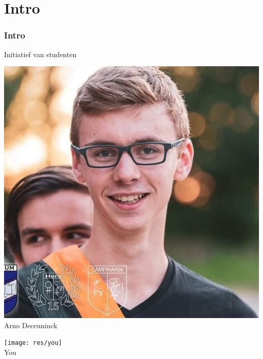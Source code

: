 

\section{Intro}
\addtocounter{minutes}{2}
\begin{frame}%
	\frametitle{Intro}%
    Initiatief van studenten
	\vspace{0.2cm}
	
   	\centering%
    \begin{minipage}{0.30\linewidth}%
        \centering%
        \noindent\includegraphics[width=\linewidth]{res/arno} \\%
        \footnotesize Arno Deceuninck \strut%
    \end{minipage}
    \begin{minipage}{0.30\linewidth}%
        \centering%
		\texttt{[image: res/you]} \\%
        \footnotesize You \strut%
    \end{minipage}
    \begin{minipage}{0.30\linewidth}%
        \centering%

\end{minipage}
\end{frame}
